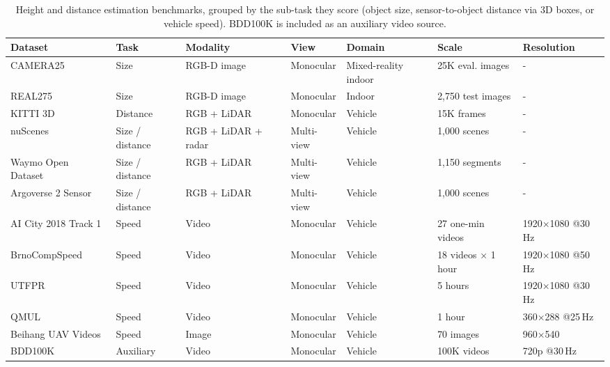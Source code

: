 \begin{table}[!ht]
    \centering
    \caption{Height and distance estimation benchmarks, grouped by the sub-task they score (object size, sensor-to-object distance via 3D boxes, or vehicle speed). BDD100K is included as an auxiliary video source.}
    \label{tab:height_distance_estimate_benchmark}
    \fontsize{9}{11}\selectfont
    \setlength{\tabcolsep}{1.0mm}
    \begin{tabular}{L{0.19\textwidth} C{0.07\textwidth} C{0.15\textwidth} C{0.09\textwidth} C{0.09\textwidth} C{0.12\textwidth} C{0.21\textwidth}}
    \toprule
    \textbf{Dataset} & \textbf{Task} & \textbf{Modality} & \textbf{View} & \textbf{Domain} & \textbf{Scale} & \textbf{Resolution} \\
    \midrule
    CAMERA25 \cite{Wang0HVSG19} & Size  & RGB-D image & Monocular & Mixed-reality indoor & 25K eval. images & - \\
    REAL275 \cite{Wang0HVSG19} & Size  & RGB-D image & Monocular & Indoor & 2,750 test images & - \\
    KITTI 3D~\cite{Geiger2013KITTI} & Distance & RGB + LiDAR     & Monocular     & Vehicle     & 15K frames     & - \\
    nuScenes~\cite{caesar2020nuscenes}     & Size / distance     & RGB + LiDAR + radar     & Multi-view     & Vehicle     & 1,000 scenes & - \\
    Waymo Open Dataset~\cite{WaymoOpen-SunKDCPTGZCCVHN20}     & Size / distance   & RGB + LiDAR     & Multi-view     & Vehicle     & 1,150 segments & - \\
    Argoverse 2 Sensor~\cite{wilson2023argoverse}     & Size / distance  & RGB + LiDAR     & Multi-view     & Vehicle     & 1,000 scenes & - \\
    AI City 2018 Track 1 \cite{Naphade_2018_CVPR_Workshops} & Speed  & Video & Monocular & Vehicle & 27 one-min videos & 1920$\times$1080 @30\,Hz \\
    BrnoCompSpeed \cite{SochorJSMSHZ17} & Speed  & Video & Monocular & Vehicle & 18 videos $\times$ 1 hour & 1920$\times$1080 @50\,Hz\\
    UTFPR \cite{LuvizonNM17} & Speed  & Video & Monocular & Vehicle & 5 hours & 1920$\times$1080 @30\,Hz\\
    QMUL \cite{moazzam2019image} & Speed & Video & Monocular & Vehicle & 1 hour & 360$\times$288 @25\,Hz \\
    Beihang UAV Videos \cite{KeKLW15} & Speed & Image & Monocular & Vehicle & 70 images & 960$\times$540\\
    BDD100K~\cite{yu2020bdd100k}     & Auxiliary     & Video     & Monocular     & Vehicle     & 100K videos & 720p @30\,Hz\\
    \bottomrule
    \end{tabular}
\end{table}

